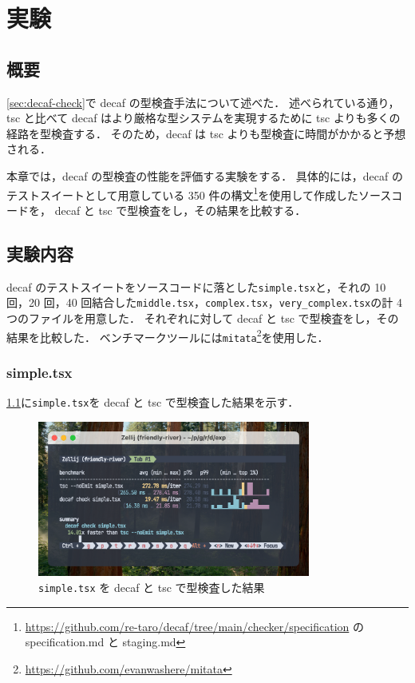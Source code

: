 \chapter{実験}

\section{概要}

\ref{sec:decaf-check}で decaf の型検査手法について述べた．
述べられている通り，tsc と比べて decaf はより厳格な型システムを実現するために tsc よりも多くの経路を型検査する．
そのため，decaf は tsc よりも型検査に時間がかかると予想される．

本章では，decaf の型検査の性能を評価する実験をする．
具体的には，decaf のテストスイートとして用意している 350 件の構文\footnote{\url{https://github.com/re-taro/decaf/tree/main/checker/specification} の specification.md と staging.md}を使用して作成したソースコードを，
decaf と tsc で型検査をし，その結果を比較する．

\section{実験内容}

decaf のテストスイートをソースコードに落とした\texttt{simple.tsx}と，それの 10 回，20 回，40 回結合した\texttt{middle.tsx}，\texttt{complex.tsx}，\texttt{very\_complex.tsx}の計 4 つのファイルを用意した．
それぞれに対して decaf と tsc で型検査をし，その結果を比較した．
ベンチマークツールには\texttt{mitata}\footnote{\url{https://github.com/evanwashere/mitata}}を使用した．

\subsection{simple.tsx}

\ref{fig:simple}に\texttt{simple.tsx}を decaf と tsc で型検査した結果を示す．

\begin{figure}[H]
    \centering
    \includegraphics[width=0.8\textwidth]{figures/fig_exp_1_simple_tsx.png}
    \caption{\texttt{simple.tsx} を decaf と tsc で型検査した結果}
    \label{fig:simple}
\end{figure}


